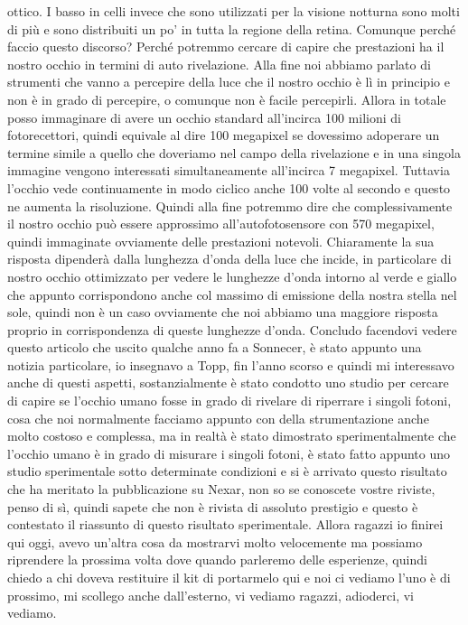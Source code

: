 ottico. I basso in celli invece che sono utilizzati per la visione notturna sono molti di più e sono distribuiti un po' in tutta la regione della retina. Comunque perché faccio questo discorso? Perché potremmo cercare di capire che prestazioni ha il nostro occhio in termini di auto rivelazione. Alla fine noi abbiamo parlato di strumenti che vanno a percepire della luce che il nostro occhio è lì in principio e non è in grado di percepire, o comunque non è facile percepirli. Allora in totale posso immaginare di avere un occhio standard all'incirca 100 milioni di fotorecettori, quindi equivale al dire 100 megapixel se dovessimo adoperare un termine simile a quello che doveriamo nel campo della rivelazione e in una singola immagine vengono interessati simultaneamente all'incirca 7 megapixel. Tuttavia l'occhio vede continuamente in modo ciclico anche 100 volte al secondo e questo ne aumenta la risoluzione. Quindi alla fine potremmo dire che complessivamente il nostro occhio può essere approssimo all'autofotosensore con 570 megapixel, quindi immaginate ovviamente delle prestazioni notevoli. Chiaramente la sua risposta dipenderà dalla lunghezza d'onda della luce che incide, in particolare di nostro occhio ottimizzato per vedere le lunghezze d'onda intorno al verde e giallo che appunto corrispondono anche col massimo di emissione della nostra stella nel sole, quindi non è un caso ovviamente che noi abbiamo una maggiore risposta proprio in corrispondenza di queste lunghezze d'onda. Concludo facendovi vedere questo articolo che uscito qualche anno fa a Sonnecer, è stato appunto una notizia particolare, io insegnavo a Topp, fin l'anno scorso e quindi mi interessavo anche di questi aspetti, sostanzialmente è stato condotto uno studio per cercare di capire se l'occhio umano fosse in grado di rivelare di riperrare i singoli fotoni, cosa che noi normalmente facciamo appunto con della strumentazione anche molto costoso e complessa, ma in realtà è stato dimostrato sperimentalmente che l'occhio umano è in grado di misurare i singoli fotoni, è stato fatto appunto uno studio sperimentale sotto determinate condizioni e si è arrivato questo risultato che ha meritato la pubblicazione su Nexar, non so se conoscete vostre riviste, penso di sì, quindi sapete che non è rivista di assoluto prestigio e questo è contestato il riassunto di questo risultato sperimentale. Allora ragazzi io finirei qui oggi, avevo un'altra cosa da mostrarvi molto velocemente ma possiamo riprendere la prossima volta dove quando parleremo delle esperienze, quindi chiedo a chi doveva restituire il kit di portarmelo qui e noi ci vediamo l'uno è di prossimo, mi scollego anche dall'esterno, vi vediamo ragazzi, adioderci, vi vediamo.

